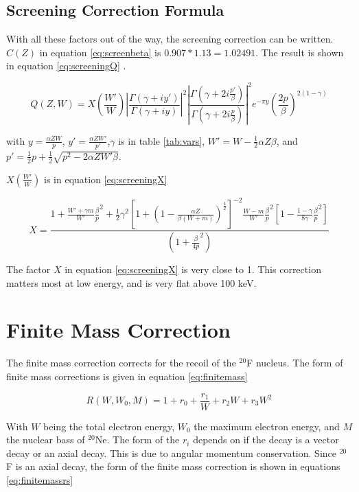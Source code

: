 {\subsection{Screening Correction Formula}
With all these factors out of the way, the screening correction can be written.
$C(Z)$ in equation \ref{eq:screenbeta} is $0.907 * 1.13 = 1.02491$.
The result is shown in equation \ref{eq:screeningQ} \cite{Buh84}.

\begin{equation}
	Q(Z,W) = X(\frac{W'}{W})|\frac{\Gamma(\gamma + i y')}{\Gamma(\gamma+ i y)}|^{2}|\frac{\Gamma(\gamma + 2 i \frac{p'}{\beta})}{\Gamma(\gamma + 2 i \frac{p}{\beta})}|^{2}e^{-\pi y}(\frac{2p}{\beta})^{2(1 - \gamma)}
	\label{eq:screeningQ}
\end{equation}

with $y = \frac{\alpha Z W}{p}$, $y' = \frac{\alpha Z W'}{p'}$,$ \gamma$ is in table \ref{tab:vars}, $W' = W - \frac{1}{2}\alpha Z \beta$, and $p' = \frac{1}{2}p + \frac{1}{2}\sqrt{p^{2} - 2 \alpha Z W' \beta}$.

$X(\frac{W'}{W})$ is in equation \ref{eq:screeningX}

\begin{equation}
	X = \frac{1 + \frac{W' + \gamma m}{W'} \frac{\beta}{p}^{2} + \frac{1}{2}\gamma^{2}[1 + (1 - \frac{\alpha Z}{\beta(W + m)})^{\frac{1}{2}}]^{-2}\frac{W - m}{W'} \frac{\beta}{p}^{2}[1 - \frac{1 - \gamma}{8\gamma}\frac{\beta}{p}^{2}]}{(1 + \frac{\beta}{4p}^{2})}
	\label{eq:screeningX}
\end{equation}

The factor $X$ in equation \ref{eq:screeningX} is very close to 1.
This correction matters most at low energy, and is very flat above 100 keV.

\section{Finite Mass Correction}
The finite mass correction corrects for the recoil of the $^{20}$F nucleus.
The form of finite mass corrections is given in equation \ref{eq:finitemass} \cite{WIL90}

\begin{equation}
	R(W,W_{0},M) = 1 + r_{0} + \frac{r_{1}}{W} + r_{2}W + r_{3}W^{2}
	\label{eq:finitemass}
\end{equation}

With $W$ being the total electron energy, $W_{0}$ the maximum electron energy,  and $M$ the nuclear bass of $^{20}$Ne.
The form of the $r_{i}$ depends on if the decay is a vector decay or an axial decay. 
This is due to angular momentum conservation.
Since $^{20}$F is an axial decay, the form of the finite mass correction is shown in equations \ref{eq:finitemassrs} 

}
